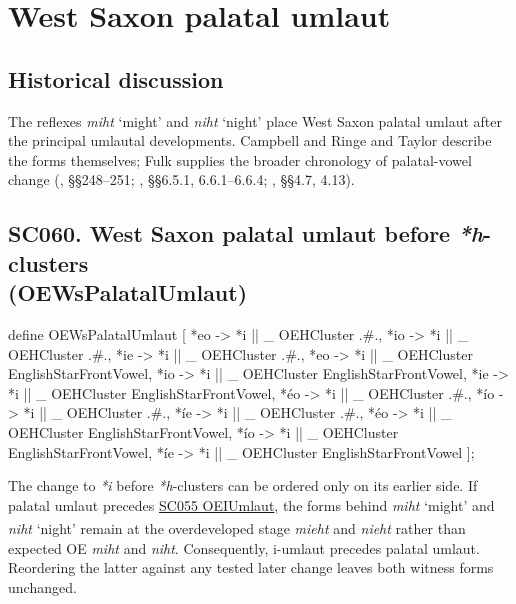\documentclass[
  british,
  a4paper,
  openany]{book}
\providecommand{\Pred}[1]{\textsuperscript{\dag}\emph{#1}}
\providecommand{\texorpdfstring}[2]{#1}
\DeclareRobustCommand{\CAPRRuleHeading}[2]{%
  #1\texorpdfstring{\\(#2)}{ (#2)}%
}
\providecommand{\Pred}[1]{\textsuperscript{\dag}\emph{#1}}
\begin{document}
\newpage

\section{West Saxon palatal umlaut}\label{west-saxon-palatal-umlaut}

\subsection{Historical discussion}\label{historical-discussion-32}

The reflexes \emph{miht} `might' and \emph{niht} `night' place West
Saxon palatal umlaut after the principal umlautal developments. Campbell
and Ringe and Taylor describe the forms themselves; Fulk supplies the
broader chronology of palatal-vowel change
(, §§248--251;
, §§6.5.1,
6.6.1--6.6.4; , §§4.7, 4.13).

\subsection{\texorpdfstring{\CAPRRuleHeading{SC060. West Saxon palatal umlaut before \emph{*h}-clusters}{OEWsPalatalUmlaut}}{}}\label{rule-OEWsPalatalUmlaut}

\begin{ReaderFacingFoma}
define OEWsPalatalUmlaut [
    {*eo} -> {*i} || _ OEHCluster .#.,
    {*io} -> {*i} || _ OEHCluster .#.,
    {*ie} -> {*i} || _ OEHCluster .#.,
    {*eo} -> {*i} || _ OEHCluster EnglishStarFrontVowel,
    {*io} -> {*i} || _ OEHCluster EnglishStarFrontVowel,
    {*ie} -> {*i} || _ OEHCluster EnglishStarFrontVowel,
    {*éo} -> {*i} || _ OEHCluster .#.,
    {*ío} -> {*i} || _ OEHCluster .#.,
    {*íe} -> {*i} || _ OEHCluster .#.,
    {*éo} -> {*i} || _ OEHCluster EnglishStarFrontVowel,
    {*ío} -> {*i} || _ OEHCluster EnglishStarFrontVowel,
    {*íe} -> {*i} || _ OEHCluster EnglishStarFrontVowel
];
\end{ReaderFacingFoma}

The change to \emph{*i} before \emph{*h}-clusters can be ordered only on
its earlier side. If palatal umlaut precedes
\hyperref[rule-OEIUmlaut]{SC055 OEIUmlaut}, the forms behind \emph{miht}
`might' and \emph{niht} `night' remain at the overdeveloped stage
\Pred{mieht} and \Pred{nieht} rather than expected OE \emph{miht} and
\emph{niht}. Consequently, i-umlaut precedes palatal umlaut. Reordering
the latter against any tested later change leaves both witness forms
unchanged.
\end{document}
